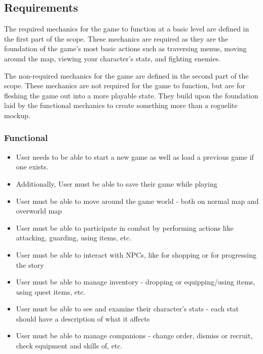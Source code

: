 \documentclass[10pt,conference,onecolumn,compsoc]{IEEEtran}
\begin{document}
\subsection{Requirements}
The required mechanics for the game to function at a basic level are defined in the first part of the scope. These mechanics are required as they are the foundation of the game's most basic actions such as traversing menus, moving around the map, viewing your character's stats, and fighting enemies.

The non-required mechanics for the game are defined in the second part of the scope. These mechanics are not required for the game to function, but are for fleshing the game out into a more playable state. They build upon the foundation laid by the functional mechanics to create something more than a roguelite mockup.


\subsubsection{Functional}
\begin{itemize}
\item User needs to be able to start a new game as well as load a previous game if one exists. \item Additionally, User must be able to save their game while playing 
\item User must be able to move around the game world - both on normal map and overworld map
\item User must be able to participate in combat by performing actions like attacking, guarding, using items, etc.
\item User must be able to interact with NPCs, like for shopping or for progressing the story
\item User must be able to manage inventory - dropping or equipping/using items, using quest items, etc.
\item User must be able to see and examine their character's stats - each stat should have a description of what it affects 
\item User must be able to manage companions - change order, dismiss or recruit, check equipment and skills of, etc.
\end{itemize}
\end{document}
